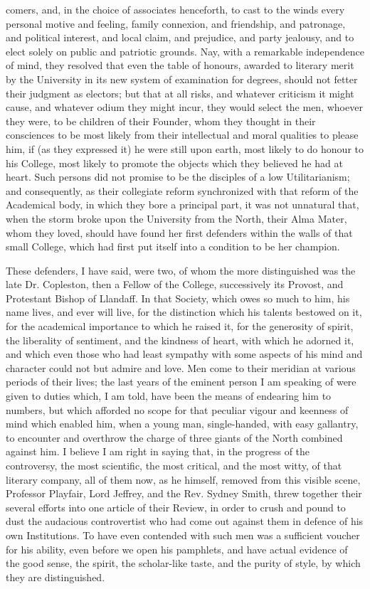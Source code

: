 comers, and, in the choice of associates henceforth, to cast to the
winds every personal motive and feeling, family connexion, and
friendship, and patronage, and political interest, and local claim,
and prejudice, and party jealousy, and to elect solely on public and
patriotic grounds. Nay, with a remarkable independence of mind, they
resolved that even the table of honours, awarded to literary merit by
the University in its new system of examination for degrees, should
not fetter their judgment as electors; but that at all risks, and
whatever criticism it might cause, and whatever odium they might
incur, they would select the men, whoever they were, to be children of
their Founder, whom they thought in their consciences to be most
likely from their intellectual and moral qualities to please him, if
(as they expressed it) he were still upon earth, most likely to do
honour to his College, most likely to promote the objects which they
believed he had at heart. Such persons did not promise to be the
disciples of a low Utilitarianism; and consequently, as their
collegiate reform synchronized with that reform of the Academical
body, in which they bore a principal part, it was not unnatural that,
when the storm broke upon the University from the North, their Alma
Mater, whom they loved, should have found her first defenders within
the walls of that small College, which had first put itself into a
condition to be her champion.

These defenders, I have said, were two, of whom the more
distinguished was the late Dr. Copleston, then a Fellow of the
College, successively its Provost, and Protestant Bishop of Llandaff.
In that Society, which owes so much to him, his name lives, and ever
will live, for the distinction which his talents bestowed on it, for
the academical importance to which he raised it, for the generosity of
spirit, the liberality of sentiment, and the kindness of heart, with
which he adorned it, and which even those who had least sympathy with
some aspects of his mind and character could not but admire and love.
Men come to their meridian at various periods of their lives; the last
years of the eminent person I am speaking of were given to duties
which, I am told, have been the means of endearing him to numbers, but
which afforded no scope for that peculiar vigour and keenness of mind
which enabled him, when a young man, single-handed, with easy
gallantry, to encounter and overthrow the charge of three giants of
the North combined against him. I believe I am right in saying that,
in the progress of the controversy, the most scientific, the most
critical, and the most witty, of that literary company, all of them
now, as he himself, removed from this visible scene, Professor
Playfair, Lord Jeffrey, and the Rev. Sydney Smith, threw together
their several efforts into one article of their Review, in order to
crush and pound to dust the audacious controvertist who had come out
against them in defence of his own Institutions. To have even
contended with such men was a sufficient voucher for his ability, even
before we open his pamphlets, and have actual evidence of the good
sense, the spirit, the scholar-like taste, and the purity of style, by
which they are distinguished.

